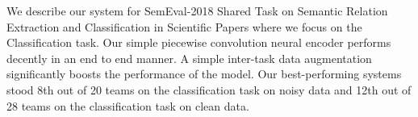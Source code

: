 We describe our system for SemEval-2018 Shared Task on Semantic Relation Extraction and Classification in Scientific Papers where we focus on the Classification task. Our simple piecewise convolution neural encoder performs decently in an end to end manner. A simple inter-task data augmentation significantly boosts the performance of the model. Our best-performing systems stood 8th out of 20 teams on the classification task on noisy data and 12th out of 28 teams on the classification task on clean data.
